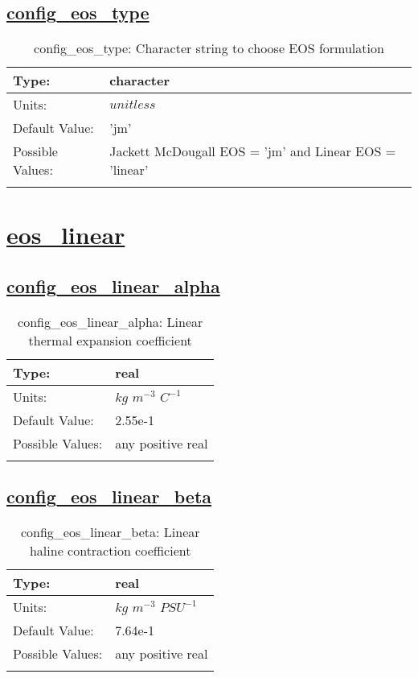 \subsection[config\_eos\_type]{\hyperref[sec:nm_tab_eos]{config\_eos\_type}}
\label{subsec:nm_sec_config_eos_type}
\begin{center}
\begin{longtable}{| p{2.0in} | p{4.0in} |}
    \hline
    Type: & character \\
    \hline
    Units: & $unitless$ \\
    \hline
    Default Value: & 'jm' \\
    \hline
    Possible Values: & Jackett McDougall EOS = 'jm' and Linear EOS = 'linear' \\
    \hline
    \caption{config\_eos\_type: Character string to choose EOS formulation}
\end{longtable}
\end{center}
\section[eos\_linear]{\hyperref[sec:nm_tab_eos_linear]{eos\_linear}}
\label{sec:nm_sec_eos_linear}
\subsection[config\_eos\_linear\_alpha]{\hyperref[sec:nm_tab_eos_linear]{config\_eos\_linear\_alpha}}
\label{subsec:nm_sec_config_eos_linear_alpha}
\begin{center}
\begin{longtable}{| p{2.0in} | p{4.0in} |}
    \hline
    Type: & real \\
    \hline
    Units: & $kg$ $m^{-3}$ $C^{-1}$ \\
    \hline
    Default Value: & 2.55e-1 \\
    \hline
    Possible Values: & any positive real \\
    \hline
    \caption{config\_eos\_linear\_alpha: Linear thermal expansion coefficient}
\end{longtable}
\end{center}
\subsection[config\_eos\_linear\_beta]{\hyperref[sec:nm_tab_eos_linear]{config\_eos\_linear\_beta}}
\label{subsec:nm_sec_config_eos_linear_beta}
\begin{center}
\begin{longtable}{| p{2.0in} | p{4.0in} |}
    \hline
    Type: & real \\
    \hline
    Units: & $kg$ $m^{-3}$ $PSU^{-1}$ \\
    \hline
    Default Value: & 7.64e-1 \\
    \hline
    Possible Values: & any positive real \\
    \hline
    \caption{config\_eos\_linear\_beta: Linear haline contraction coefficient}
\end{longtable}
\end{center}
